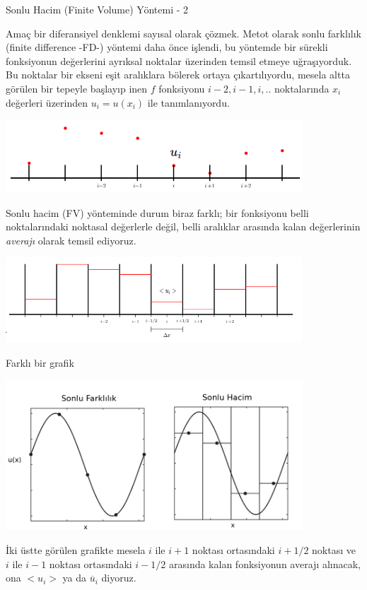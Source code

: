 \documentclass[12pt,fleqn]{article}\usepackage{../../common}
\begin{document}
Sonlu Hacim (Finite Volume) Yöntemi - 2

Amaç bir diferansiyel denklemi sayısal olarak çözmek. Metot olarak sonlu
farklılık (finite difference -FD-) yöntemi daha önce işlendi, bu yöntemde bir
sürekli fonksiyonun değerlerini ayrıksal noktalar üzerinden temsil etmeye
uğraşıyorduk.  Bu noktalar bir ekseni eşit aralıklara bölerek ortaya
çıkartılıyordu, mesela altta görülen bir tepeyle başlayıp inen $f$ fonksiyonu
$i-2,i-1,i,..$ noktalarında $x_i$ değerleri üzerinden $u_i = u(x_i)$ ile
tanımlanıyordu.

\includegraphics[width=30em]{13-22-29.png}

Sonlu hacim (FV) yönteminde durum biraz farklı; bir fonksiyonu belli
noktalarındaki noktasal değerlerle değil, belli aralıklar arasında kalan
değerlerinin {\em averajı} olarak temsil ediyoruz.

\includegraphics[width=30em]{13-22-34.png}

Farklı bir grafik

\includegraphics[width=30em]{13-16-00.png}

İki üstte görülen grafikte mesela $i$ ile $i+1$ noktası ortasındaki $i+1/2$
noktası ve $i$ ile $i-1$ noktası ortasındaki $i-1/2$ arasında kalan fonksiyonun
averajı alınacak, ona $< u_i >$ ya da $\overline{u}_i$ diyoruz.
\end{document}
